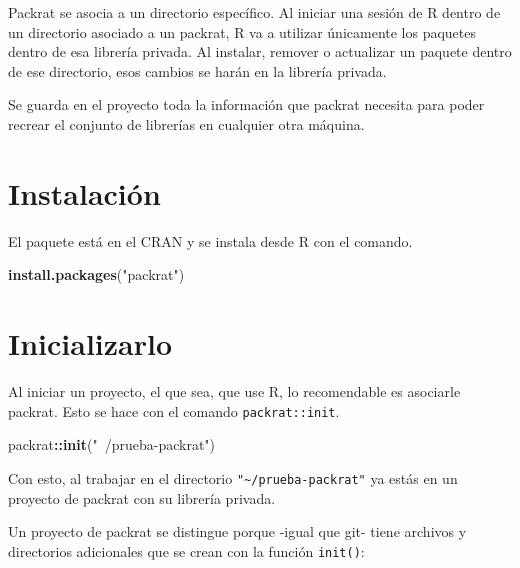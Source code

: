 \documentclass[]{article}
\newenvironment{Shaded}{\begin{snugshade}}{\end{snugshade}}
\newcommand{\KeywordTok}[1]{\textcolor[rgb]{0.13,0.29,0.53}{\textbf{#1}}}
\newcommand{\StringTok}[1]{\textcolor[rgb]{0.31,0.60,0.02}{#1}}
\newcommand{\OperatorTok}[1]{\textcolor[rgb]{0.81,0.36,0.00}{\textbf{#1}}}
\newcommand{\NormalTok}[1]{#1}
\begin{document}
Packrat se asocia a un directorio específico. Al iniciar una sesión de R
dentro de un directorio asociado a un packrat, R va a utilizar
únicamente los paquetes dentro de esa librería privada. Al instalar,
remover o actualizar un paquete dentro de ese directorio, esos cambios
se harán en la librería privada.

Se guarda en el proyecto toda la información que packrat necesita para
poder recrear el conjunto de librerías en cualquier otra máquina.

\section{Instalación}\label{instalacion}

El paquete está en el CRAN y se instala desde R con el comando.

\begin{Shaded}
\begin{Highlighting}[]
\KeywordTok{install.packages}\NormalTok{(}\StringTok{"packrat"}\NormalTok{)}
\end{Highlighting}
\end{Shaded}

\section{Inicializarlo}\label{inicializarlo}

Al iniciar un proyecto, el que sea, que use R, lo recomendable es
asociarle packrat. Esto se hace con el comando \texttt{packrat::init}.

\begin{Shaded}
\begin{Highlighting}[]
\NormalTok{packrat}\OperatorTok{::}\KeywordTok{init}\NormalTok{(}\StringTok{"~/prueba-packrat"}\NormalTok{)}
\end{Highlighting}
\end{Shaded}

Con esto, al trabajar en el directorio
\texttt{"\textasciitilde{}/prueba-packrat"} ya estás en un proyecto de
packrat con su librería privada.

Un proyecto de packrat se distingue porque -igual que git- tiene
archivos y directorios adicionales que se crean con la función
\texttt{init()}:
\end{document}

